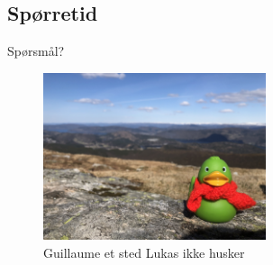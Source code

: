 \subsection*{Spørretid}
\begin{frame}{Spørsmål?}
    \begin{figure}
        \centering
        \includegraphics[height = 4.9cm]{images/guillaume3.jpg}
        \caption{Guillaume et sted Lukas ikke husker}
        \label{fig:guillaume3}
    \end{figure}
\end{frame}